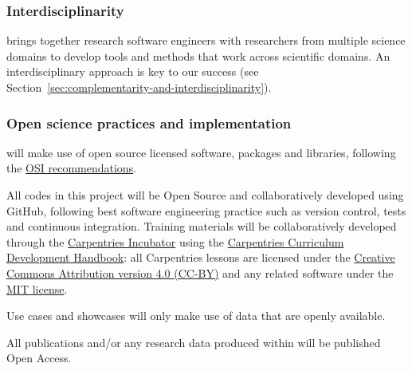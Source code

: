\subsubsection{Interdisciplinarity}

\TheProject{} brings together research software engineers with researchers from
multiple science domains to develop tools and methods that work across
scientific domains. An interdisciplinary approach is key to our success
(see Section~\ref{sec:complementarity-and-interdisciplinarity}).

\subsubsection{Open science practices and implementation}\label{sec:open-science-practices}

\TheProject will make use of open source licensed software, packages and libraries, following the \href{https://opensource.org/licenses}{OSI recommendations}.

All codes in this project will be Open Source and collaboratively developed using GitHub, following best software engineering practice
such as version control, tests and continuous integration.
Training materials will be collaboratively developed through the \href{https://carpentries-incubator.org/}{Carpentries Incubator}
using the \href{https://cdh.carpentries.org/}{Carpentries Curriculum Development Handbook}: all Carpentries lessons are licensed under
the \href{https://creativecommons.org/licenses/by/4.0/legalcode}{Creative Commons Attribution version 4.0 (CC-BY)} and any related software under
the \href{https://opensource.org/licenses/MIT}{MIT license}.

Use cases and showcases will only make use of data that are openly available.

All publications and/or any research data produced within \TheProject will be published Open Access.



